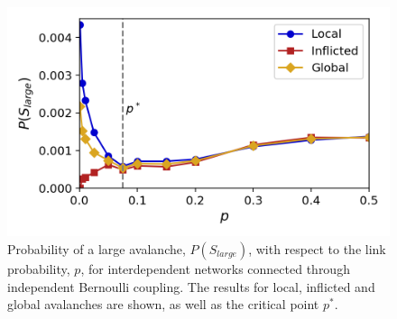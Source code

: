 \begin{figure}[!h]
	\begin{center}
	\includegraphics[scale=0.75]{./images/task_15/large_S_vs_p_joint_AB.png} 
	\end{center}
	\caption{Probability of a large avalanche, $P(S_{large})$, with respect to the link probability, $p$, for interdependent networks connected through independent Bernoulli coupling. The results for local, inflicted and global avalanches are shown, as well as the critical point $p^*$. \\} 
	\label{fig:large_S_vs_p_joint_AB} 
\end{figure}



\newpage